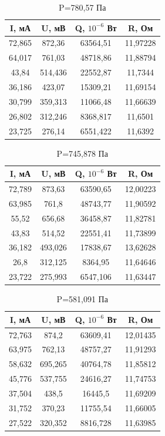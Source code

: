 \documentclass[a4paper]{article}
\begin{document}
	\begin{table}[h!]
 		\centering
    	\begin{tabular}{| c | c | c | c |}
    		\hline
    		I, мА & U, мВ & Q, $10^{-6}$ Вт & R, Ом \\
    		\hline
    		72,865	& 872,36 &	63564,51	&11,97228\\
    		\hline
64,017	&761,03	&48718,86	&11,88794\\
    		\hline
43,84&	514,436	&22552,87&	11,7344\\
    		\hline
36,186	&423,07	&15309,21&	11,69154\\
    		\hline
30,799&	359,313	&11066,48	&11,66639\\
    		\hline
26,802	&312,246&	8368,817&	11,6501\\
    		\hline
23,725&	276,14	&6551,422	&11,6392\\
    		\hline
    	\end{tabular}
    	\caption{P=780,57 Па}
	\end{table}
	\begin{table}[h!]
 		\centering
    	\begin{tabular}{| c | c | c | c |}
    		\hline
    		I, мА & U, мВ & Q, $10^{-6}$ Вт & R, Ом \\
    		\hline
    		72,789 &	873,63	& 63590,65 &	12,00223\\
    		\hline
63,985	& 761,8	& 48743,77	& 11,90592\\
    		\hline
55,52& 	656,68	& 36458,87 &	11,82781\\
    		\hline
43,83	& 514,52	& 22551,41& 	11,73899\\
    		\hline
36,182	& 493,026& 	17838,67& 	13,62628\\
    		\hline
26,8	& 312,125	& 8364,95	&11,64646\\
    		\hline
23,722	&275,993	&6547,106	&11,63447\\
    		\hline
    	\end{tabular}
    	\caption{P=745,878 Па}
	\end{table}
	\begin{table}[h!]
 		\centering
    	\begin{tabular}{| c | c | c | c |}
    		\hline
    		I, мА & U, мВ & Q, $10^{-6}$ Вт & R, Ом \\
    		\hline
    		72,763	& 874,2	& 63609,41& 	12,01435\\
    		\hline
63,975	& 762,13	& 48757,27	& 11,91293\\
    		\hline
58,632	& 695,265	& 40764,78	& 11,85812\\
    		\hline
45,776	& 537,755	& 24616,27	& 11,74753\\
    		\hline
37,504	& 438,5	& 16445,5	& 11,69209\\
    		\hline
31,752	& 370,23& 	11755,54& 	11,66005\\
    		\hline
27,522	& 320,352	& 8816,728	& 11,63985\\
    		\hline
    	\end{tabular}
    	\caption{P=581,091 Па}
	\end{table}
\end{document}
